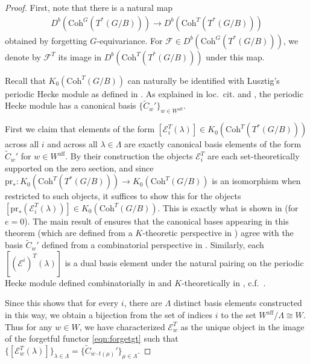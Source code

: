 \documentclass{amsart}
\theoremstyle{definition}
\begin{document}
\begin{proof}

    First, note that there is a natural map 
    \begin{align}\label{eqn:forgetgt}
        D^b(\mathrm{Coh}^G(T^*(G/B))) \to D^b(\mathrm{Coh}^T(T^*(G/B)))
    \end{align}
    obtained by forgetting $G$-equivariance. For $\mathcal{F} \in D^b(\mathrm{Coh}^G(T^*(G/B)))$, we denote by $\mathcal{F}^T$ its image in $D^b(\mathrm{Coh}^T(T^*(G/B)))$ under this map.

    Recall that $K_0(\mathrm{Coh}^T(G/B))$ can naturally be identified with Lusztig's periodic Hecke module as defined in \cite{LPeriodic1, LPeriodic2}. As explained in loc.\ cit. and \cite{Lk2}, the periodic Hecke module has a canonical basis $\{\tilde{C}_w'\}_{w \in W^{\mathrm{aff}}}$.

    First we claim that elements of the form $[\mathcal{E}_i^T(\lambda)] \in K_0(\mathrm{Coh}^T(T^*(G/B)))$ across all $i$ and across all $\lambda \in \Lambda$ are exactly canonical basis elements of the form $\tilde{C}_w'$ for $w \in W^{\mathrm{aff}}$. By their construction the objects $\mathcal{E}_i^T$ are each set-theoretically supported on the zero section, and since $\mathrm{pr}_* : K_0(\mathrm{Coh}^T(T^*(G/B))) \to K_0(\mathrm{Coh}^T(G/B))$ is an isomorphism when restricted to such objects, it suffices to show this for the objects $[\mathrm{pr}_*(\mathcal{E}_i^T(\lambda))] \in K_0(\mathrm{Coh}^T(G/B))$. This is exactly what is shown in \cite[\S 5.3.6]{BM} (for $e = 0$). The main result of \cite{Lk2} ensures that the canonical bases appearing in this theorem (which are defined from a $K$-theoretic perspective in \cite{Lk1}) agree with the basis $\tilde{C}_w'$ defined from a combinatorial perspective in \cite{LPeriodic1, LPeriodic2}. Similarly, each $[(\mathcal{E}^i)^T(\lambda)]$ is a dual basis element under the natural pairing on the periodic Hecke module defined combinatorially in \cite{LPeriodic2} and $K$-theoretically in \cite{Lk1}, c.f.\ \cite[\S 5.3.6]{BM}. 

    Since this shows that for every $i$, there are $\Lambda$ distinct basis elements constructed in this way, we obtain a bijection from the set of indices $i$ to the set $W^{\mathrm{aff}}/\Lambda \cong W$. Thus for any $w \in W$, we have characterized $\mathcal{E}_w^T$ as the unique object in the image of the forgetful functor \eqref{eqn:forgetgt} such that $\{[\mathcal{E}_w^T(\lambda)]\}_{\lambda \in \Lambda} = \{\tilde{C}_{w \cdot t(\mu)}'\}_{\mu \in \Lambda}$.


\end{proof}
\end{document}
